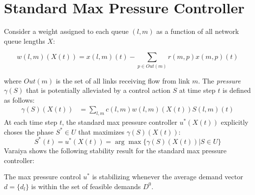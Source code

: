 \section{Standard Max Pressure Controller} \label{sec:immediatefeedback}
Consider a weight assigned to each queue $(l,m)$ as a function of all network queue lengths $X$:
\begin{small}
\begin{equation} \label{linkweight}
w(l,m)(X(t))= x(l,m)(t) - \sum_{p \in Out(m)} r(m,p)x(m,p)(t)
\end{equation}
\end{small}
where $Out(m)$ is the set of all links receiving flow from link $m$. 
The \emph{pressure} $\gamma(S)$ that is potentially alleviated by a control action $S$ at time step $t$ is defined as follows: 
\begin{align}
\gamma(S)(X(t)) &= \sum_{l,m}c(l,m)w(l,m)(X(t))S(l,m)(t) 
\end{align}
At each time step $t$, the standard max pressure controller $u^{*}(X(t))$ explicitly choses the phase $S^*\in U$ that maximizes $\gamma(S)(X(t))$:
\begin{equation} \label{original_MP}
S^*(t)  = u^{*}(X(t)) = \arg\max\{\gamma(S)(X(t)) \vert S \in U\} 
\end{equation}
Varaiya \cite{Varaiya2013} shows the following stability result for the standard max pressure controller:
\begin{Thm}\label{StabMP}
The max pressure control $u^{*}$ is stabilizing whenever the average demand vector $d = \lbrace d_{l}\rbrace$ is within the set of feasible demands $D^0$. 
\end{Thm}

